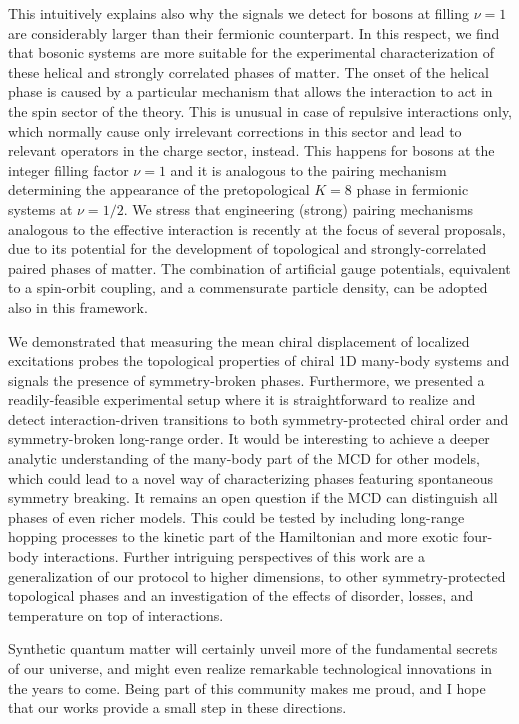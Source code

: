 This intuitively explains also why the signals we detect for bosons at filling $\nu = 1$ are considerably larger than their fermionic counterpart.
In this respect, we find that bosonic systems are more suitable for the experimental characterization of these helical and strongly correlated phases of matter.
The onset of the helical phase is caused by a particular mechanism that allows the interaction to act in the spin sector of the theory.
This is unusual in case of repulsive interactions only, which normally cause only irrelevant corrections in this sector and lead to relevant operators in the charge sector, instead.
This happens for bosons at the integer filling factor $\nu=1$ and it is analogous to the pairing mechanism determining the appearance of the pretopological $K = 8$ phase in fermionic systems at $\nu=1/2$.
We stress that engineering (strong) pairing mechanisms analogous to the effective interaction is recently at the focus of several proposals, due to its potential for the development of topological and strongly-correlated paired phases of matter.
The combination of artificial gauge potentials, equivalent to a spin-orbit coupling, and a commensurate particle density, can be adopted also in this framework.

We demonstrated that measuring the mean chiral displacement of localized excitations probes the topological properties of chiral 1D many-body systems and signals the presence of symmetry-broken phases.
Furthermore, we presented a readily-feasible experimental setup where it is straightforward to realize and detect interaction-driven transitions to both symmetry-protected chiral order and symmetry-broken long-range order.
It would be interesting to achieve a deeper analytic understanding of the many-body part of the MCD for other models, which could lead to a novel way of characterizing phases featuring spontaneous symmetry breaking.
It remains an open question if the MCD can distinguish all phases of even richer models.
This could be tested by including long-range hopping processes to the kinetic part of the Hamiltonian and more exotic four-body interactions.
Further intriguing perspectives of this work are a generalization of our protocol to higher dimensions, to other symmetry-protected topological phases and an investigation of the effects of disorder, losses, and temperature on top of interactions.

Synthetic quantum matter will certainly unveil more of the fundamental secrets of our universe, and might even realize remarkable technological innovations in the years to come.
Being part of this community makes me proud, and I hope that our works provide a small step in these directions.
